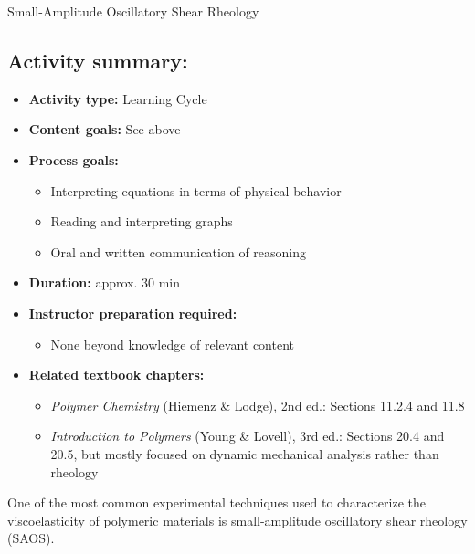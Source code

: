 \begin{activity}[extension]{Small-Amplitude Oscillatory Shear Rheology}
\begin{instructornotes}
	\subsection*{Activity summary:}
	\begin{itemize}
		\item \textbf{Activity type:} Learning Cycle
		\item \textbf{Content goals:} See above
		\item \textbf{Process goals:} %
			\begin{itemize}
				\item Interpreting equations in terms of physical behavior
				\item Reading and interpreting graphs
				\item Oral and written communication of reasoning
			\end{itemize}
		\item \textbf{Duration:} approx. 30 min
		\item \textbf{Instructor preparation required:} 
			\begin{itemize}
				\item None beyond knowledge of relevant content
			\end{itemize}
		\item \textbf{Related textbook chapters:}
			\begin{itemize}
				\item \emph{Polymer Chemistry} (Hiemenz \& Lodge), 2nd ed.: Sections 11.2.4 and 11.8
				\item \emph{Introduction to Polymers} (Young \& Lovell), 3rd ed.: Sections 20.4 and 20.5, but mostly focused on dynamic mechanical analysis rather than rheology
			\end{itemize}
	\end{itemize}

\end{instructornotes}



\begin{model}
\label{model:rheology}

	One of the most common experimental techniques used to characterize the viscoelasticity of polymeric materials is small-amplitude oscillatory shear rheology (SAOS).
	

\end{model}
\end{activity}
